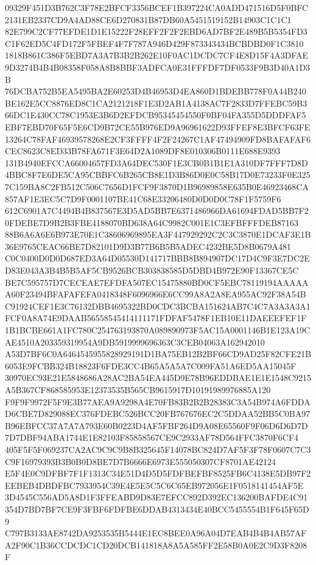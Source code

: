 \documentclass[UTF8,fontset=fandol,zihao=-4,a4paper]{ctexart}
\begin{document}
{{09329F451D3B762C3F78E2BFCF3356BCEF1B397224CA0ADD471516D5F0BFC2131EB2337CD9A4AD88CE6D270831B87DB60A5451519152B14903C1C1C1
82E799C2CF77EFDE1D1E15222F28EFF2F2F2EBD6AD7BF2E489B5B5354FD3C1F62ED5C4FD172F5FBEF4F7F787A946D429F873343434BCBDBD0F1C3810
1818B861C386F5EBD7A3A7B3B2B262E10F0AC1DCDC7CF4E8D15F4A3DFAE9D3274B4B4B08358F058A8B8BBF3ADFCA0E31FFFDF7DF0533F9B3D40A1D3B
76DCBA752B5EA5495BA2E60253D4B46953D4EA860D1BDEBB778F0A44B240BE162E5CC8876ED8C1CA2121218F1E3D2AB1A4138AC7F2833D7FFEBC59B3
66DC1E430CC78C1953E3B6D2EFDCB95345454550F0BF04FA355D5DDDFAF5EBF7EBD70F65F5E6CD9B72CE55B976ED9A96961622D93FFEF8E3BFCF63FE
13264C78FAF46939578268E2CF3FFFF4F2F24267C1AF47494909FD8BAFAFAF6CEC8623C8ED33B78FA671F3E64D2A1089DF8E010306B0111E688E9393
131B4940EFCCA66004657FD3A64DEC530F1E3CB0B1B1E1A310DF7FFF7D8D4BBC8F7E6DE5CA95CBBFC6B265CB8E1D3B86D0E0C58B17D0E73233F0E325
7C159BA8C2FB512C506C7656D1FCF9F3870D1B96989858E635B0E46923468CA857AF1E3EC5C7D9F0001107BE41C68E33206480D0D0D0C78F1F5759F6
612C6901A7C4494B4B837567E3D5AD5BB7E6371486966DA61694FDAD5BB7F20FDEBE7D9B2B3FBE4188070BD638A64C9982C001E1C3EFBFFFDEB87163
88B6A6A6E6B973E70E1C38606969895EA3F447929292C2C3C3870E1DCAF3E1B36E9765CEAC66BE7D82101D9D3B77B6B5B5ADEC4232BE5D8B0679A481
C0C0400D0D0D687ED3A64D05530D141717BBB8B894907DC17D4C9F3E7DC2ED83E043A3B4B5B5AF5CB9526BCB303838585D5DBD4B972E90F13367CE5C
BE7C595757D7CECEAE7EFDFA507EC15475880BD0CF5EBC78119194AAAAAA60F23494BFAFAFEFA0418348F6096966E6CC99A8A2A8EA955AC92F38A54B
C91924CEF1E3C76132DBB4695322BD0CDC3BCBA151624AB7C4C7A3A3A3A1FCF0A8A74E9DAAB56558545414111171FDFAF5478F1EB10E11DAEEEFEF1F
1B1BCBE661A1FC780C254763193870A089890973F5AC15A0001146B1E123A19CAE4510A203359319954A9DB5919999696363C3CEB04063A162942010
A53D7BF6C0A6464545955828929191D1BA75EB12B2BF66CD9AD25F82CFE21B6053E9FCBB324B18823F6FDE3CC4B65A5A5A7C009FA51A6ED5AA15045F
30970EC93E21E5848686A28AC2BA54EA445D9E78B96EDDBAE1E1E1548C9215A5B367CF868585953E12373535B565CB9615917D10191989976885A120
F9F9F9972F5F9E3B77AEA9A9298A4E70FB83B2B2B28383C3A54B974A6FDDAD6CBE7D829088EC376FDEBC526BCC20FB767676EC2C5DDAA52BB5C0BA97
B96EBFCC37A7A7A793E60B0223D4AF5FBF264D9A08E65560F9F06D6D6D7D7D7DBF94ABA1744E1E82103F85858567CE9C2933AF78D564FFC3870F6CF4
405F5F5F069237CA2AC9C9C9B8B325645F14078BC824D7AF5F3F78F0607C7C3C9F16979393B3B0B0D8BE7D7B6666E6973E555050307CF8701AE42124
E5F4E0C9DFBF7F1F1313C34E51D4D5D5FDFBEFBF8525FB6C4138E5DB97F2EEBEB4DBDFBC7933954C39E4E5E5C5C6C65EB972056E1F0518141454AF5E
3D4545C556AD5A8D1F3FFEABD9D83E7EFCC892D392EC136200BAFDE4C91354D7BD7BF7CE9F3FBF6FDFBE6DDAB4313434E40BCC5455554B1F645F65D9
C797B3133AE8742DA9253535B5444E1EC8BEE0A96A04D7EAB4B4B4AB57AFA2F90C1B36CCDCDC1CD20DCB141818A8A5A585FF2E58B0A0E2C9D3F8208F
}}
\end{document}
